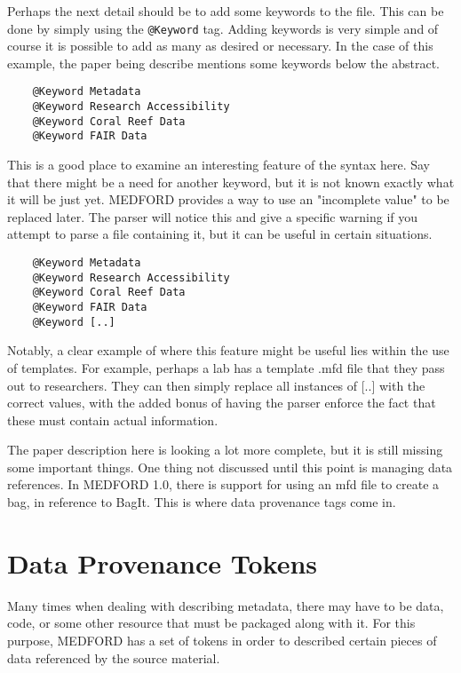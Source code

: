 \documentclass[]{article}%
\begin{document}
Perhaps the next detail should be to add some keywords to the file. This can be done by simply using the 
\texttt{@Keyword} tag. Adding keywords is very simple and of course it is possible to add as many as desired or necessary. In the case of this example, the paper being describe mentions some keywords below the abstract.
\begin{small}
\begin{verbatim}
    @Keyword Metadata
    @Keyword Research Accessibility
    @Keyword Coral Reef Data
    @Keyword FAIR Data
\end{verbatim}
\end{small}

This is a good place to examine an interesting feature of the syntax here. Say that there might be a need for another keyword, but it is not known exactly what it will be just yet. MEDFORD provides a way to use an "incomplete value" to be replaced later. The parser will notice this and give a specific warning if you attempt to parse a file containing it, but it can be useful in certain situations.

\begin{small}
\begin{verbatim}
    @Keyword Metadata
    @Keyword Research Accessibility
    @Keyword Coral Reef Data
    @Keyword FAIR Data
    @Keyword [..]
\end{verbatim}
\end{small}

Notably, a clear example of where this feature might be useful lies within the use of templates. For example, perhaps a lab has a template .mfd file that they pass out to researchers. They can then simply replace all instances of [..] with the correct values, with the added bonus of having the parser enforce the fact that these must contain actual information.

The paper description here is looking a lot more complete, but it is still missing some important things. One thing not discussed until this point is managing data references. In MEDFORD 1.0, there is support for using an mfd file to create a bag, in reference to BagIt. This is where data provenance tags come in.
\section{Data Provenance Tokens}

Many times when dealing with describing metadata, there may have to be data, code, or some other resource that must be packaged along with it. For this purpose, MEDFORD has a set of tokens in order to described certain pieces of data referenced by the source material. 
\end{document}
